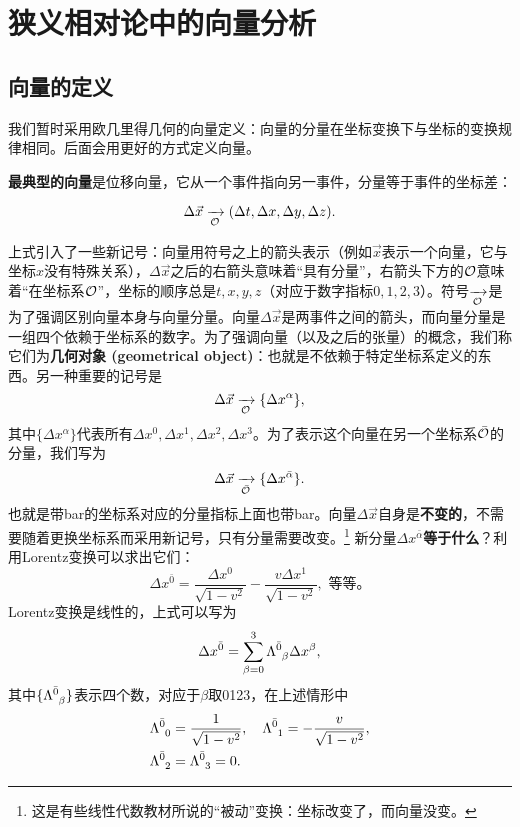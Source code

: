 \chapter{狭义相对论中的向量分析}
\label{chap2}

\section{向量的定义}
\label{sec2.1}
我们暂时采用欧几里得几何的向量定义：向量的分量在坐标变换下与坐标的变换规律相同。后面会用更好的方式定义向量。

\textbf{最典型的向量}是位移向量，它从一个事件指向另一事件，分量等于事件的坐标差：
\begin{shaded}
\begin{equation}
    \Delta \vec{x} \xrightarrow[\mathcal{O}]{ } (\Delta t, \Delta x, \Delta y, \Delta z).
\label{equ2.1}
\end{equation}
\end{shaded}
上式引入了一些新记号：向量用符号之上的箭头表示（例如$\vec{x}$表示一个向量，它与坐标$x$没有特殊关系），$\Delta \vec{x}$之后的右箭头意味着“具有分量”，右箭头下方的$\mathcal{O}$意味着“在坐标系$\mathcal{O}$”，坐标的顺序总是$t, x, y, z$（对应于数字指标$0, 1, 2, 3$）。符号$\xrightarrow[\mathcal{O}]{ }$是为了强调区别向量本身与向量分量。向量$\Delta \vec{x}$是两事件之间的箭头，而向量分量是一组四个依赖于坐标系的数字。为了强调向量（以及之后的张量）的概念，我们称它们为\textbf{几何对象 (geometrical object)}：也就是不依赖于特定坐标系定义的东西。另一种重要的记号是
\begin{equation}
    \Delta \vec{x} \xrightarrow[\mathcal{O}]{ } \{ \Delta x^\alpha \},
\label{equ2.2}
\end{equation}
其中$\{ \Delta x^\alpha \}$代表所有$\Delta x^0, \Delta x^1, \Delta x^2, \Delta x^3$。为了表示这个向量在另一个坐标系$\bar{\mathcal{O}}$的分量，我们写为
\[
    \Delta \vec{x} \xrightarrow[\bar{\mathcal{O}}]{ }  \{\Delta x^{\bar{\alpha}} \}.
\]
也就是带bar的坐标系对应的分量指标上面也带bar。向量$\Delta \vec{x}$自身是\textbf{不变的}，不需要随着更换坐标系而采用新记号，只有分量需要改变。\footnote{这是有些线性代数教材所说的“被动”变换：坐标改变了，而向量没变。} 新分量$\Delta x^{\bar{\alpha}}$\textbf{等于什么}？利用Lorentz变换可以求出它们：
\[
    \Delta x^{\bar{0}} = \frac{\Delta x^0}{\sqrt{1 - v^2}} - \frac{v \Delta x^1}{\sqrt{1 - v^2}}, \text{\ 等等。}
\]
Lorentz变换是线性的，上式可以写为
\[
    \Delta x^{\bar{0}} = \sum_{\beta = 0}^3 \Lambda\indices{^{\bar{0}}_\beta} \Delta x^{\beta},
\]
其中$\{ \Lambda\indices{^{\bar{0}}_\beta} \}$表示四个数，对应于$\beta$取0123，在上述情形中
\begin{align*}
    \Lambda\indices{^{\bar{0}}_0} &= \frac{1}{\sqrt{1 - v^2}}, \quad \Lambda\indices{^{\bar{0}}_1} = -\frac{v}{\sqrt{1 - v^2}}, \\
    \Lambda\indices{^{\bar{0}}_2} &= \Lambda\indices{^{\bar{0}}_3} = 0.
\end{align*}
